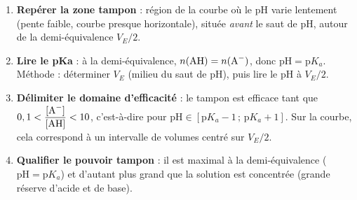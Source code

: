 \documentclass[11pt]{article}
\newcommand{\cle}[1]{{\popxbold\color{popdark}#1}}
\begin{document}
\begin{methode}[Exploiter la zone tampon sur pH = f(V)]
\begin{enumerate}
\item \textbf{Repérer la zone tampon} : région de la courbe où le pH varie \cle{lentement} (pente faible, courbe presque horizontale), située \emph{avant} le saut de pH, autour de la demi-équivalence $V_{E}/2$.
\item \textbf{Lire le pKa} : à la demi-équivalence, $n(\ce{AH}) = n(\ce{A-})$, donc $\text{pH} = \text{p}K_a$. Méthode : déterminer $V_E$ (milieu du saut de pH), puis lire le pH à $V_E/2$.
\item \textbf{Délimiter le domaine d'efficacité} : le tampon est efficace tant que $0,1 < \dfrac{[\ce{A-}]}{[\ce{AH}]} < 10$, c'est-à-dire pour $\text{pH} \in [\text{p}K_a - 1\,;\,\text{p}K_a + 1]$. Sur la courbe, cela correspond à un intervalle de volumes centré sur $V_E/2$.
\item \textbf{Qualifier le pouvoir tampon} : il est \cle{maximal} à la demi-équivalence ($\text{pH} = \text{p}K_a$) et d'autant plus grand que la solution est \cle{concentrée} (grande réserve d'acide et de base).
\end{enumerate}
\end{methode}
\end{document}
